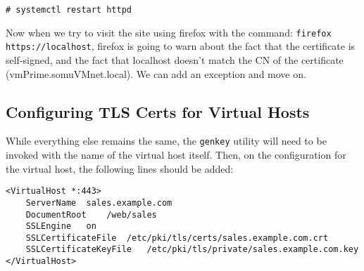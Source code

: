 \vspace{-15pt}
\begin{verbatim}
# systemctl restart httpd
\end{verbatim}
\vspace{-10pt}	

\noindent
Now when we try to visit the site using firefox with the command: \verb|firefox https://localhost|, firefox is going to warn about the fact that the certificate is self-signed, and the fact that localhost doesn't match the CN of the certificate (vmPrime.somuVMnet.local). We can add an exception and move on. 

\subsection{Configuring TLS Certs for Virtual Hosts}
While everything else remains the same, the \verb|genkey| utility will need to be invoked with the name of the virtual host itself. Then, on the configuration for the virtual host, the following lines should be added:

\vspace{-15pt}
\begin{verbatim}
<VirtualHost *:443>
	ServerName	sales.example.com
	DocumentRoot	/web/sales
	SSLEngine	on
	SSLCertificateFile	/etc/pki/tls/certs/sales.example.com.crt	
	SSLCertificateKeyFile	/etc/pki/tls/private/sales.example.com.key	
</VirtualHost>
\end{verbatim}
\vspace{-10pt}	